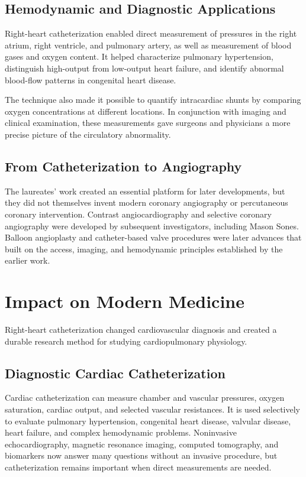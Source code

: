 \subsection{Hemodynamic and Diagnostic Applications}

Right-heart catheterization enabled direct measurement of pressures in the right atrium, right ventricle, and pulmonary artery, as well as measurement of blood gases and oxygen content. It helped characterize pulmonary hypertension, distinguish high-output from low-output heart failure, and identify abnormal blood-flow patterns in congenital heart disease.

The technique also made it possible to quantify intracardiac shunts by comparing oxygen concentrations at different locations. In conjunction with imaging and clinical examination, these measurements gave surgeons and physicians a more precise picture of the circulatory abnormality.

\subsection{From Catheterization to Angiography}

The laureates' work created an essential platform for later developments, but they did not themselves invent modern coronary angiography or percutaneous coronary intervention. Contrast angiocardiography and selective coronary angiography were developed by subsequent investigators, including Mason Sones. Balloon angioplasty and catheter-based valve procedures were later advances that built on the access, imaging, and hemodynamic principles established by the earlier work.

\section{Impact on Modern Medicine}

Right-heart catheterization changed cardiovascular diagnosis and created a durable research method for studying cardiopulmonary physiology.

\subsection{Diagnostic Cardiac Catheterization}

Cardiac catheterization can measure chamber and vascular pressures, oxygen saturation, cardiac output, and selected vascular resistances. It is used selectively to evaluate pulmonary hypertension, congenital heart disease, valvular disease, heart failure, and complex hemodynamic problems. Noninvasive echocardiography, magnetic resonance imaging, computed tomography, and biomarkers now answer many questions without an invasive procedure, but catheterization remains important when direct measurements are needed.

